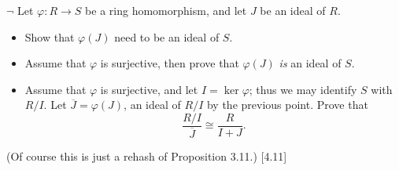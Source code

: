 \begin{problem}
	$\neg$ Let $\varphi: R \to S$ be a ring homomorphism, and let $J$ be an ideal of $R$.
	\begin{itemize}
		\item Show that $\varphi(J)$ need to be an ideal of $S$.
		\item Assume that $\varphi$ is surjective, then prove that $\varphi(J)$ \emph{is} an ideal of $S$.
		\item Assume that $\varphi$ is surjective, and let $I = \ker \varphi$; thus we may identify $S$ with $R/I$. Let $\overline{J} = \varphi(J)$, an ideal of $R/I$ by the previous point. Prove that
		\[
			\frac{R/I}{\overline{J}} \cong \frac{R}{I + J} \text{.}
		\]
	\end{itemize}
	(Of course this is just a rehash of Proposition 3.11.) [4.11]
\end{problem}

